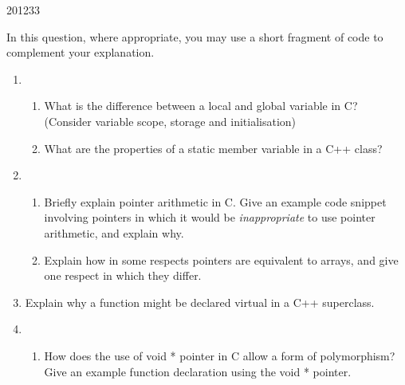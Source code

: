 \documentclass[10pt,\jkfside,a4paper]{article}
\begin{document}
\begin{examquestion}{2012}{3}{3}

In this question, where appropriate, you may use a short fragment of code to
complement your explanation.

\begin{enumerate}[label=(alph*)]

\item

\begin{enumerate}[label=(\roman*)]

\item What is the difference between a local and global variable in C?
(Consider variable scope, storage and initialisation)


\item What are the properties of a static member variable in a C++ class?


\end{enumerate}

\item

\begin{enumerate}[label=(\roman*)]

\item Briefly explain pointer arithmetic in C. Give an example code snippet
involving pointers in which it would be \textit{inappropriate} to use
pointer arithmetic, and explain why.


\item Explain how in some respects pointers are equivalent to arrays, and
give one respect in which they differ.


\end{enumerate}

\item Explain why a function might be declared virtual in a C++ superclass.


\item

\begin{enumerate}[label=(\roman*)]

\item How does the use of void * pointer in C allow a form of polymorphism?
Give an example function declaration using the void * pointer.


\end{enumerate}
\end{enumerate}
\end{examquestion}
\end{document}
